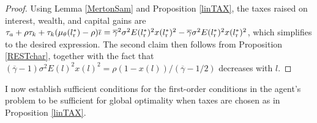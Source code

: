 \documentclass[11pt]{article}
\theoremstyle{plain}
\begin{document}
\begin{proof}
Using Lemma \ref{MertonSam} and Proposition \ref{linTAX}, the taxes raised on interest, wealth, and capital gains are $\tau_a + \rho \tau_k + \tau_k(\mu_{\theta}(l_{\textnormal{r}}^*) - \rho)\overline{\iota} = \overline{\gamma}^2 \sigma^2 E(l_{\textnormal{r}}^*)^2 x(l_{\textnormal{r}}^*)^2 -\overline{\gamma} \sigma^2 E(l_{\textnormal{r}}^*)^2 x(l_{\textnormal{r}}^*)^2$, which simplifies to the desired expression. The second claim then follows from Proposition \ref{RESTchar}, together with the fact that $(\overline{\gamma}-1) \sigma^2 E(l)^2 x(l)^2 = \rho(1- x(l))/(\overline{\gamma}-1/2)$ decreases with $l$.
\end{proof} %

I now establish sufficient conditions for the first-order conditions in the agent's problem to be sufficient for global optimality when taxes are chosen as in Proposition \ref{linTAX}. 
\end{document}
